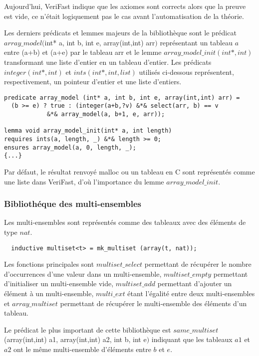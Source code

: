 \documentclass[11pt,openany]{article}
\newcommand{\verifast}{VeriFast}
\begin{document}
			Aujourd'hui, \verifast{} indique que les axiomes sont corrects alors que la preuve est vide, ce n'\'etait logiquement pas le cas avant l'automatisation de la th\'eorie.
			
			Les derniers pr\'edicats et lemmes majeurs de la biblioth\`eque sont le pr\'edicat $array\_model($int* a, int b, int e, array(int,int) arr$)$ repr\'esentant un tableau $a$ entre (a+b) et (a+e) par le tableau arr et le lemme $array\_model\_init(int*,int)$ transformant une liste d'entier en un tableau d'entier. Les pr\'edicats $integer(int*,int)$ et $ints(int*,int,list)$ utilis\'es ci-dessous repr\'esentent, respectivement, un pointeur d'entier et une liste d'entiers.
			\begin{lstlisting}
predicate array_model (int* a, int b, int e, array(int,int) arr) =
  (b >= e) ? true : (integer(a+b,?v) &*& select(arr, b) == v 
  			&*& array_model(a, b+1, e, arr));
  			
lemma void array_model_init(int* a, int length)
requires ints(a, length, _) &*& length >= 0;
ensures array_model(a, 0, length, _);
{...}

			\end{lstlisting}
			
			Par d\'efaut, le r\'esultat renvoy\'e malloc ou un tableau en C sont repr\'esent\'es comme une liste dans \verifast, d'o\`u l'importance du lemme $array\_model\_init$.
			\subsubsection{Biblioth\'eque des multi-ensembles}
			Les multi-ensembles sont repr\'esent\'es comme des tableaux avec des \'el\'ements de type $nat$.
			\begin{lstlisting}
  inductive multiset<t> = mk_multiset (array(t, nat));
			\end{lstlisting}
			Les fonctions principales sont $multiset\_select$ permettant de r\'ecup\'erer le nombre d'occurrences d'une valeur dans un multi-ensemble, $multiset\_empty$ permettant d'initialiser un multi-ensemble vide, $multiset\_add$ permettant d'ajouter un \'el\'ement \`a un multi-ensemble, $multi\_ext$ \'etant l'\'egalit\'e entre deux multi-ensembles et $array\_multiset$ permettant de r\'ecup\'erer le multi-ensemble des \'el\'ements d'un tableau.
			
			Le pr\'edicat le plus important de cette biblioth\`eque est $same\_multiset$(array(int,int) a1, array(int,int) a2, int b, int e$)$ indiquant que les tableaux $a1$ et $a2$ ont le m\^eme multi-ensemble d'\'el\'ements entre $b$ et $e$.
			
\end{document}
